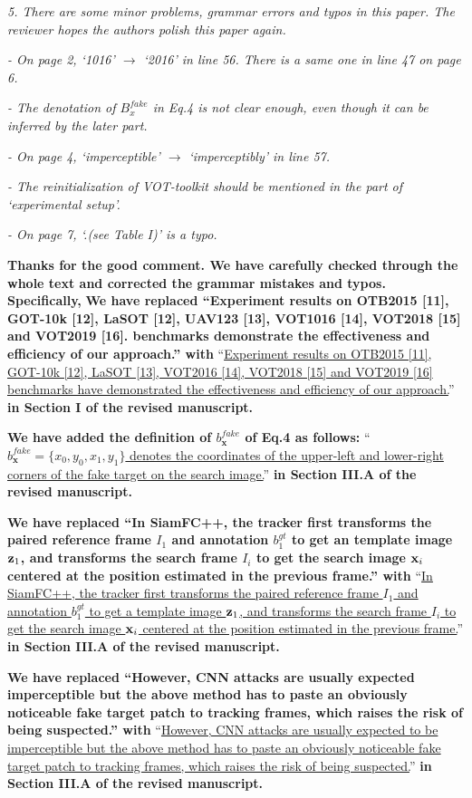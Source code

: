 \documentclass[12pt]{article}
\begin{document}
\textit{
5. There are some minor problems, grammar errors and typos in this paper. The reviewer hopes the authors polish this paper again.}

\textit{- On page 2, ‘1016’ $\rightarrow$ ‘2016’ in line 56. There is a same one in line 47 on page 6.}

\textit{- The denotation of $B_x^{fake}$ in Eq.4 is not clear enough, even though it can be inferred by the later part.}

\textit{- On page 4, ‘imperceptible’ $\rightarrow$ ‘imperceptibly’ in line 57.}

\textit{- The reinitialization of VOT-toolkit should be mentioned in the part of ‘experimental setup’.}

\textit{- On page 7, ‘.(see Table I)’ is a typo.}

\textbf{Thanks for the good comment. We have carefully checked through the whole text and corrected the grammar mistakes and typos. Specifically,}
\textbf{We have replaced ``Experiment results on OTB2015 [11], GOT-10k [12], LaSOT [12], UAV123 [13], VOT1016 [14], VOT2018 [15] and VOT2019 [16]. benchmarks demonstrate the effectiveness and efficiency of our approach.'' with}
``\uline{Experiment results on OTB2015 [11], GOT-10k [12], LaSOT [13], VOT2016 [14], VOT2018 [15] and VOT2019 [16] benchmarks have demonstrated the effectiveness and efficiency of our approach.}''
\textbf{in Section I of the revised manuscript.}

\textbf{We have added the definition of $b_{\textbf{x}}^{fake}$ of Eq.4 as follows:}
``\uline{$b_{\textbf{x}}^{fake} = \{x_0, y_0, x_1, y_1\}$ denotes the coordinates of the upper-left and lower-right corners of the fake target on the search image.}''
\textbf{in Section III.A of the revised manuscript.}

\textbf{We have replaced ``In SiamFC++, the tracker first transforms the paired reference frame $I_1$ and annotation $b_1^{gt}$ to get an template image $\textbf z_1$, and transforms the search frame $I_i$ to get the search image $\textbf x_i$ centered at the position estimated in the previous frame.'' with}
``\uline{In SiamFC++, the tracker first transforms the paired reference frame $I_1$ and annotation $b_1^{gt}$ to get a template image $\textbf z_1$, and transforms the search frame $I_i$ to get the search image $\textbf x_i$ centered at the position estimated in the previous frame.}''
\textbf{in Section III.A of the revised manuscript.}

\textbf{We have replaced ``However, CNN attacks are usually expected imperceptible but the above method has to paste an obviously noticeable fake target patch to tracking frames, which raises the risk of being suspected.'' with}
``\uline{However, CNN attacks are usually expected to be imperceptible but the above method has to paste an obviously noticeable fake target patch to tracking frames, which raises the risk of being suspected.}''
\textbf{in Section III.A of the revised manuscript.}
\end{document}
